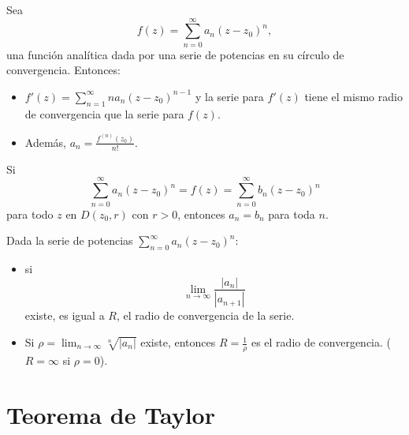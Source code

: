 \documentclass[spanish,presentation]{beamer}
\begin{document}
\begin{frame}[label=sec-2-3]{}
\begin{theorem}
Sea
\begin{displaymath}
f(z)=\sum_{n=0}^{\infty}a_{n}(z-z_{0})^{n},
\end{displaymath}
una función analítica dada por una serie de potencias en su
círculo de convergencia. Entonces:
\begin{itemize}
\item \(f'(z)=\sum_{n=1}^{\infty}na_{n}(z-z_{0})^{n-1}\) y la
serie para \(f'(z)\) tiene el mismo radio de convergencia que la
serie para \(f(z)\).
\item Además, \(a_{n}=\frac{f^{(n)}(z_{0})}{n!}\).
\end{itemize}
\end{theorem}
\end{frame}

\begin{frame}[label=sec-2-4]{}
\begin{corollary}[Unicidad]
Si
\begin{displaymath}
\sum_{n=0}^{\infty}a_{n}(z-z_{0})^{n}=f(z)=\sum_{n=0}^{\infty}b_{n}(z-z_{0})^{n}
\end{displaymath}
para todo \(z\) en \(D(z_{0},r)\) con \(r>0\), entonces
\(a_{n}=b_{n}\) para toda \(n\).
\end{corollary}
\end{frame}

\begin{frame}[label=sec-2-5]{}
\begin{theorem}
Dada la serie de potencias
\(\sum_{n=0}^{\infty}a_{n}(z-z_{0})^{n}\):

\begin{itemize}
\item si
\begin{displaymath}
\lim_{n\to\infty}\frac{|a_{n}|}{|a_{n+1}|}
\end{displaymath}
existe, es igual a \(R\), el radio de convergencia de la serie.
\item Si \(\rho=\lim_{n\to\infty} \sqrt[n]{|a_{n}|}\) existe, entonces
\(R=\frac{1}{\rho}\) es el radio de convergencia. (\(R=\infty\)
si \(\rho=0\)).
\end{itemize}
\end{theorem}
\end{frame}

\section{Teorema de Taylor}
\label{orgheadline1}
\end{document}
